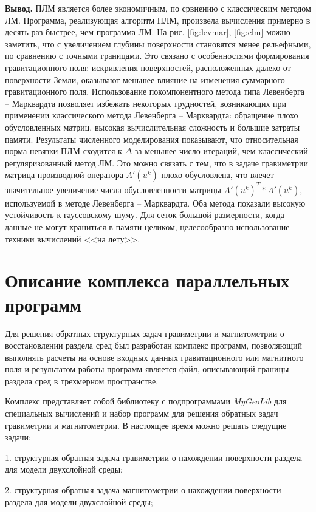 {\bfseries\large Вывод.} ПЛМ является более экономичным, по срвнению с классическим методом ЛМ. Программа, реализующая алгоритм ПЛМ, произвела вычисления примерно в десять раз быстрее, чем программа ЛМ. На рис. \ref{fig:levmar}, \ref{fig:clm} можно заметить, что с увеличением глубины поверхности становятся менее рельефными, по сравнению с точными границами. Это связано с особенностями формирования гравитационного поля: искривления поверхностей, расположенных далеко от поверхности Земли, оказывают меньшее влияние на изменения суммарного гравитационного поля. Использование покомпонентного метода типа Левенберга -- Марквардта позволяет избежать некоторых трудностей, возникающих при применении классического метода Левенберга -- Марквардта: обращение плохо обусловленных матриц, высокая вычислительная сложность и большие затраты памяти. Результаты численного моделирования показывают, что относительная норма невязки ПЛМ сходится к $\Delta$ за меньшее число итераций, чем классический регуляризованный метод ЛМ. Это можно связать с тем, что в задаче гравиметрии матрица производной оператора $A'(u^k)$ плохо обусловлена, что влечет значительное увеличение числа обусловленности матрицы $A'(u^k)^T*A'(u^k)$, используемой в методе Левенберга -- Марквардта. Оба метода показали высокую устойчивость к гауссовскому шуму. Для сеток большой размерности, когда данные не могут храниться в памяти целиком, целесообразно использование техники вычислений <<на лету>>.

\newpage
\section{Описание комплекса параллельных программ}

Для решения обратных структурных задач гравиметрии и магнитометрии о восстановлении раздела сред был разработан комплекс программ, позволяющий выполнять расчеты на основе входных данных гравитационного или магнитного поля и результатом работы программ является файл, описывающий границы раздела сред в трехмерном пространстве.

Комплекс представляет собой библиотеку с подпрограммами \textit{MyGeoLib} для специальных вычислений и набор программ для решения обратных задач гравиметрии и магнитометрии. В настоящее время можно решать следущие задачи:

1. структурная обратная задача гравиметрии о нахождении поверхности раздела для модели двухслойной среды;

2. структурная обратная задача магнитометрии о нахождении поверхности раздела для модели двухслойной среды;

